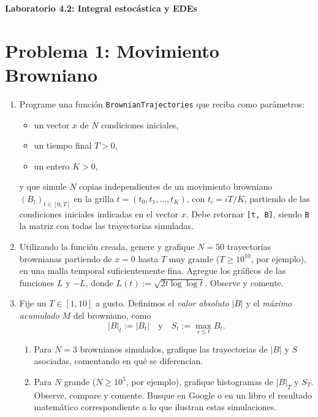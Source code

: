 \vspace{0.3cm}
\begin{center}
{\huge \textbf{Laboratorio 4.2: Integral estocástica y EDEs}}
\end{center}

\section*{Problema 1: Movimiento Browniano} %
\begin{enumerate}
	\item Programe una función \texttt{BrownianTrajectories} que reciba como parámetros:
	\begin{itemize}
		\item un vector $x$ de $N$ condiciones iniciales,
		\item un tiempo final $T>0$,
		\item un entero $K>0$,
	\end{itemize}
	y que simule $N$ copias independientes de un movimiento browniano $(B_t)_{t\in[0,T]}$ en la grilla $t = (t_0,t_1,\ldots,t_K)$, con $t_i = iT/K$, partiendo de las condiciones iniciales indicadas en el vector $x$. Debe retornar \texttt{[t, B]}, siendo \texttt{B} la matriz con todas las trayectorias simuladas.
	
	\item Utilizando la función creada, genere y grafique $N=50$ trayectorias brownianas partiendo de $x=0$ hasta $T$ muy grande ($T\geq 10^{10}$, por ejemplo), en una malla temporal suficientemente fina. Agregue los gráficos de las funciones $L$ y $-L$, donde $L(t) := \sqrt{2t \log \log t}$. Observe y comente.
	
	\item Fije un $T \in [1,10]$ a gusto. Definimos el \emph{valor absoluto} $|B|$ y el \emph{máximo acumulado} $M$ del browniano, como
	\[
	|B|_t := |B_t|
	\quad \text{y} \quad
	S_t := \max_{s\leq t} B_t.
	\]
	\begin{enumerate}
		\item Para $N=3$ brownianos simulados, grafique las trayectorias de $|B|$ y $S$ asociadas, comentando en qué se diferencian.
		\item Para $N$ grande ($N\geq 10^5$, por ejemplo), grafique histogramas de $|B|_T$ y $S_T$. Observe, compare y comente. Busque en Google o en un libro el resultado matemático correspondiente a lo que ilustran estas simulaciones.
	\end{enumerate}
	
\end{enumerate}


